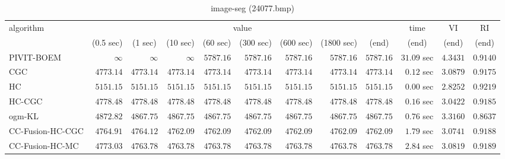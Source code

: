 \begin{table}[H]
\scriptsize
\centering
\caption{image-seg (24077.bmp)}
\label{tab:anytimetable-image-seg-24077.bmp}
\begin{tabular}{lrrrrrrrrrrr}
\toprule
           algorithm &                                   \multicolumn{8}{c}{value} & \multicolumn{1}{c}{time}    & \multicolumn{1}{c}{VI}  & \multicolumn{1}{c}{RI} \\  
\cmidrule(lr){2-9}\cmidrule(lr){10-10} \cmidrule(lr){11-11} \cmidrule(lr){12-12}   
                     & \multicolumn{1}{c}{(0.5 sec)} & \multicolumn{1}{c}{(1 sec)} & \multicolumn{1}{c}{(10 sec)} & \multicolumn{1}{c}{(60 sec)} & \multicolumn{1}{c}{(300 sec)} & \multicolumn{1}{c}{(600 sec)} & \multicolumn{1}{c}{(1800 sec)} & \multicolumn{1}{c}{(end)} & \multicolumn{1}{c}{(end)}    & \multicolumn{1}{c}{(end)}   & \multicolumn{1}{c}{(end)}  \\ \midrule 
          PIVIT-BOEM & $\infty$ & $\infty$ & $\infty$ & $      5787.16$ & $      5787.16$ & $      5787.16$ & $      5787.16$ & $      5787.16$ & $        31.09$ sec    & $       4.3431$  & $       0.9140$ \\ 
                 CGC & $      4773.14$ & $      4773.14$ & $      4773.14$ & $      4773.14$ & $      4773.14$ & $      4773.14$ & $      4773.14$ & $      4773.14$ & $         0.12$ sec    & $       3.0879$  & $       0.9175$ \\ 
                  HC & $      5151.15$ & $      5151.15$ & $      5151.15$ & $      5151.15$ & $      5151.15$ & $      5151.15$ & $      5151.15$ & $      5151.15$ & $         0.00$ sec    & $       2.8252$  & $       0.9219$ \\ 
              HC-CGC & $      4778.48$ & $      4778.48$ & $      4778.48$ & $      4778.48$ & $      4778.48$ & $      4778.48$ & $      4778.48$ & $      4778.48$ & $         0.16$ sec    & $       3.0422$  & $       0.9185$ \\ 
              ogm-KL & $      4872.82$ & $      4867.75$ & $      4867.75$ & $      4867.75$ & $      4867.75$ & $      4867.75$ & $      4867.75$ & $      4867.75$ & $         0.76$ sec    & $       3.3160$  & $       0.8637$ \\ 
    CC-Fusion-HC-CGC & $      4764.91$ & $      4764.12$ & $      4762.09$ & $      4762.09$ & $      4762.09$ & $      4762.09$ & $      4762.09$ & $      4762.09$ & $         1.79$ sec    & $       3.0741$  & $       0.9188$ \\ 
     CC-Fusion-HC-MC & $      4773.03$ & $      4763.78$ & $      4763.78$ & $      4763.78$ & $      4763.78$ & $      4763.78$ & $      4763.78$ & $      4763.78$ & $         2.84$ sec    & $       3.0819$  & $       0.9189$ \\ 

\end{tabular}
\end{table}
